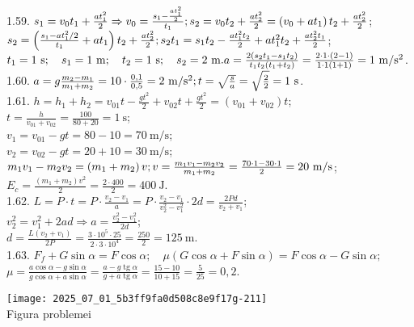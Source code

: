 1.59. $s_{1}=v_{0} t_{1}+\frac{a t_{1}^{2}}{2} \Rightarrow v_{0}=\frac{s_{1}-\frac{a t_{1}^{2}}{2}}{t_{1}};\\ s_{2}=v_{0} t_{2}+\frac{a t_{2}^{2}}{2}=\left(v_{0}+a t_{1}\right) t_{2}+\frac{a t_{2}^{2}}{2}$;\\ $s_{2}=\left(\frac{s_{1}-a t_{1}^{2} / 2}{t_{1}}+a t_{1}\right) t_{2}+\frac{a t_{2}^{2}}{2};\\ s_{2} t_{1}=s_{1} t_{2}-\frac{a t_{1}^{2} t_{2}}{2}+a t_{1}^{2} t_{2}+\frac{a t_{2}^{2} t_{1}}{2}$;\\ $t_{1}=1 \mathrm{~s}; \quad s_{1}=1 \mathrm{~m}; \quad t_{2}=1 \mathrm{~s}; \quad s_{2}=2 \mathrm{~m}.\\ a=\frac{2\left(s_{2} t_{1}-s_{1} t_{2}\right)}{t_{1} t_{2}\left(t_{1}+t_{2}\right)}=\frac{2 \cdot 1 \cdot(2-1)}{1 \cdot 1(1+1)}=1 \mathrm{~m} / \mathrm{s}^{2}$.\\

1.60. $a=g \frac{m_{2}-m_{1}}{m_{1}+m_{2}}=10 \cdot \frac{0,1}{0,5}=2 \mathrm{~m} / \mathrm{s}^{2};\\ t=\sqrt{\frac{s}{a}}=\sqrt{\frac{2}{2}}=1 \mathrm{~s}$.\\

1.61. $h=h_{1}+h_{2}=v_{01} t-\frac{g t^{2}}{2}+v_{02} t+\frac{g t^{2}}{2}=\left(v_{01}+v_{02}\right)t$;\\ $t=\frac{h}{v_{01}+v_{02}}=\frac{100}{80+20}=1 \mathrm{~s}$;\\ $v_{1}=v_{01}-g t=80-10=70 \mathrm{~m} / \mathrm{s}$;\\ $v_{2}=v_{02}-g t=20+10=30 \mathrm{~m} / \mathrm{s}$;\\ $m_{1} v_{1}-m_{2} v_{2}=\left(m_{1}+m_{2}\right)v;\\ v=\frac{m_{1} v_{1}-m_{2} v_{2}}{m_{1}+m_{2}}=\frac{70 \cdot 1-30 \cdot 1}{2}=20 \mathrm{~m} / \mathrm{s}$;\\ $E_{c}=\frac{\left(m_{1}+m_{2}\right) v^{2}}{2}=\frac{2 \cdot 400}{2}=400 \mathrm{~J}$.\\

1.62. $L=P \cdot t=P \cdot \frac{v_{2}-v_{1}}{a}=P \cdot \frac{v_{2}-v_{1}}{v_{2}^{2}-v_{1}^{2}} \cdot 2 d=\frac{2 P d}{v_{2}+v_{1}}$;\\ $v_{2}^{2}=v_{1}^{2}+2 a d \Rightarrow a=\frac{v_{2}^{2}-v_{1}^{2}}{2 d}$;\\ $d=\frac{L\left(v_{2}+v_{1}\right)}{2 P}=\frac{3 \cdot 10^{5} \cdot 25}{2 \cdot 3 \cdot 10^{4}}=\frac{250}{2}=125 \mathrm{~m}$.\\

1.63. $F_{f}+G \sin \alpha=F \cos \alpha; \quad \mu(G \cos \alpha+F \sin \alpha)=F \cos \alpha-G \sin \alpha;$\\ $\mu=\frac{a \cos \alpha-g \sin \alpha}{g \cos \alpha+a \sin \alpha}=\frac{a-g \operatorname{tg} \alpha}{g+a \operatorname{tg} \alpha}=\frac{15-10}{10+15}=\frac{5}{25}=0,2$.\\ \begin{center} \texttt{[image: 2025\_07\_01\_5b3ff9fa0d508c8e9f17g-211]}\\ Figura problemei \end{center}\\

